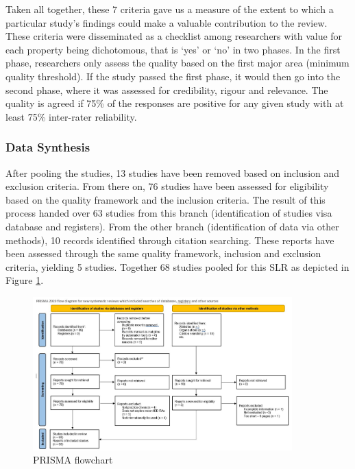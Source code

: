 \documentclass{bmcart}
\begin{document}
Taken all together, these 7 criteria gave us a measure of the extent to which a particular study's findings could make a valuable contribution to the review. These criteria were disseminated as a checklist among researchers with value for each property being dichotomous, that is `yes’ or `no’ in two
phases. In the first phase, researchers only assess the quality
based on the first major area (minimum quality threshold).
If the study passed the first phase, it would then go into the
second phase, where it was assessed for credibility, rigour
and relevance. The quality is agreed if 75\% of the responses
are positive for any given study with at least 75\% inter-rater
reliability.


\subsubsection{Data Synthesis}

After pooling the studies, 13 studies have been removed based on inclusion  and exclusion criteria. From there on, 76 studies have been assessed for eligibility based on the quality framework and the inclusion criteria. The result of this process handed over 63 studies from this branch (identification of studies visa database and registers). From the other branch (identification of data via other methods), 10 records identified through citation searching. These reports have been assessed through the same quality framework, inclusion and exclusion criteria, yielding 5 studies. Together 68 studies pooled for this SLR as depicted in Figure \ref{fig:PRISMA}.

\begin{figure}[h!]
    \centering
    \includegraphics[width=10cm]{PRISMA.JPG}
    \caption{PRISMA flowchart}
    \label{fig:PRISMA}
\end{figure}
\end{document}
